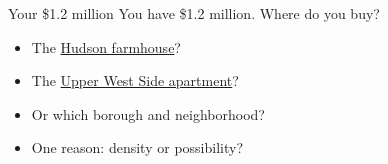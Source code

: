 \documentclass[aspectratio=169,11pt]{beamer}
\begin{document}
\begin{frame}{Your \$1.2 million}
  \centering
  {\Large You have \alert{\$1.2 million}. Where do you buy?}\\[1.2em]
  \begin{minipage}{0.62\textwidth}
    \begin{itemize}\setlength{\itemsep}{0.8em}
      \item The \href{https://www.nestseekers.com/5535527/beautifully-renovated-farmhouse-on-22-private-acres-with-a-heated}{Hudson farmhouse}?
      \item The \href{https://streeteasy.com/building/306-west-90-street-new_york/1}{Upper West Side apartment}?
      \item Or which borough and neighborhood?
      \item One reason: \alert{density} or \alert{possibility}?
    \end{itemize}
  \end{minipage}
\end{frame}
\end{document}
